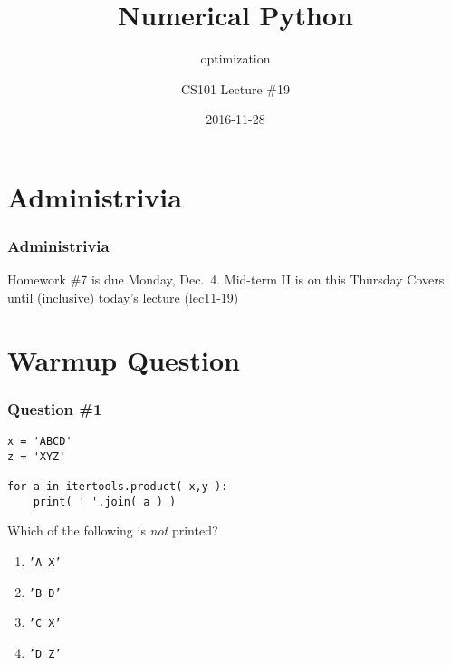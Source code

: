 \documentclass[11pt]{beamer}
\title{Numerical Python}
\subtitle{optimization}
\author{CS101 Lecture \#19}
\date{2016-11-28}
\begin{document}
  \setcounter{showProgressBar}{0}
  \setcounter{showSlideNumbers}{0}

\frame{\titlepage}

\setcounter{framenumber}{0}
\setcounter{showProgressBar}{1}
\setcounter{showSlideNumbers}{1}

\section{Administrivia}

\begin{frame}
  \frametitle{Administrivia}
  \Enlarge

  \begin{itemize}
  \myitem Homework \#7 is due Monday, Dec.\ 4. \pause
  \myitem Mid-term II is on this Thursday
  \myitem Covers until (inclusive) today's lecture (lec11-19)
  \end{itemize}
\end{frame}



\section{Warmup Question}

\begin{frame}[fragile]
  \frametitle{Question \#1}

  \begin{Verbatim}
x = 'ABCD'
z = 'XYZ'

for a in itertools.product( x,y ):
    print( ' '.join( a ) )
  \end{Verbatim}

Which of the following is \emph{not} printed?

  \begin{enumerate}[label=\Alph*]
    \item  \texttt{'A X'}
    \item  \texttt{'B D'}
    \item  \texttt{'C X'}
    \item  \texttt{'D Z'}
  \end{enumerate}
\end{frame}
\end{document}
